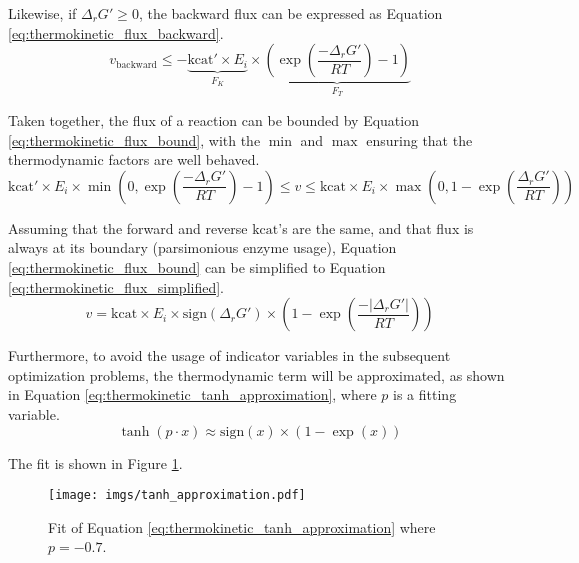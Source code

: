 Likewise, if $\Delta_r G' \geq 0$, the backward flux can be expressed as Equation \ref{eq:thermokinetic_flux_backward}.
\begin{equation}
    v_\text{backward} \leq -\underbrace{\text{kcat}' \times E_i}_{F_K} \times \underbrace{\left(\exp \left( \frac{-\Delta_r G'}{RT}\right) - 1\right)}_{F_T}
    \label{eq:thermokinetic_flux_backward}
\end{equation}

Taken together, the flux of a reaction can be bounded by Equation \ref{eq:thermokinetic_flux_bound},
with the $\min$ and $\max$ ensuring that the thermodynamic factors are well behaved.
\begin{equation}
    \text{kcat}' \times E_i \times \min{\left(0, \exp \left( \frac{-\Delta_r G'}{RT}\right) - 1\right)} \leq v \leq \text{kcat} \times E_i \times \max \left(0, 1 - \exp \left( \frac{\Delta_r G'}{RT} \right)\right)
    \label{eq:thermokinetic_flux_bound}
\end{equation}

Assuming that the forward and reverse $\text{kcat}$'s are the same, and that flux is always
at its boundary (parsimonious enzyme usage), Equation \ref{eq:thermokinetic_flux_bound} can be
simplified to Equation \ref{eq:thermokinetic_flux_simplified}.
\begin{equation}
    v = \text{kcat} \times E_i \times \text{sign}\left(\Delta_r G' \right) \times \left(1 - \exp \left( \frac{-|\Delta_r G'|}{RT} \right)\right)
    \label{eq:thermokinetic_flux_simplified}
\end{equation}

Furthermore, to avoid the usage of indicator variables in the subsequent optimization
problems, the thermodynamic term will be approximated, as shown in Equation
\ref{eq:thermokinetic_tanh_approximation}, where $p$ is a fitting variable.
\begin{equation}
    \tanh \left(p \cdot x \right) \approx  \text{sign}\left( x \right) \times \left(1 - \exp \left( x \right)\right)
    \label{eq:thermokinetic_tanh_approximation}
\end{equation}

The fit is shown in Figure \ref{fig:tanh_approximation}.
\begin{figure}[H]
    \centering
    \texttt{[image: imgs/tanh\_approximation.pdf]}
    \caption{Fit of Equation \ref{eq:thermokinetic_tanh_approximation} where $p=-0.7$.}
    \label{fig:tanh_approximation}
\end{figure}

